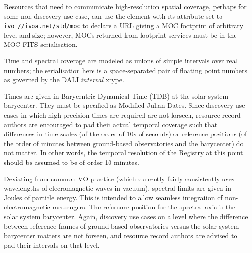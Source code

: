 \documentclass[11pt,a4paper]{ivoa}
\begin{document}
Resources that need to communicate high-resolution spatial coverage,
perhaps for some non-discovery use case, can use the 
element with its  attribute set to
\nolinkurl{ivo://ivoa.net/std/moc} to declare a URL giving a MOC 
footprint of arbitrary level and size; however, MOCs returned from
footprint services must be in the MOC FITS serialisation.

Time and spectral coverage are modeled as unions of simple
intervals over real numbers; the serialisation here is a space-separated
pair of floating point numbers as governed by the DALI \emph{interval}
xtype.

Times are given in Barycentric Dynamical Time (TDB) at the solar system
barycenter.  They must be specified as Modified Julian Dates.  Since
discovery use cases in which high-precision times are required are not
forseen, resource record authors are encouraged to pad their actual
temporal coverage such that differences in time scales (of the order of
10s of seconds) or reference positions (of the order of minutes between
ground-based observatories and the barycenter) do not matter.  In other
words, the temporal resolution of the Registry at this point should be
assumed to be of order 10 minutes.

Deviating from common VO practice (which currently fairly consistently
uses wavelengths of elecromagnetic waves in vacuum), spectral limits are
given in Joules of particle energy.  This is intended to allow seamless
integration of non-electromagnetic messengers.  The reference position
for the spectral axis is the solar system barycenter.  Again, discovery
use cases on a level where the difference between reference frames of
ground-based observatories versus the solar system barycenter matters
are not forseen, and resource record authors are advised to pad their
intervals on that level.
\end{document}
